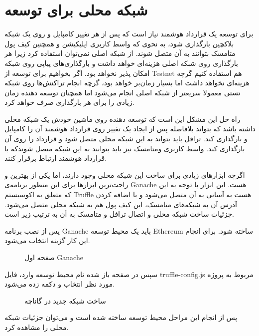 \section{شبکه محلی برای توسعه}
برای توسعه یک قرارداد هوشمند نیاز است که پس از هر تغییر کامپایل و روی یک شبکه بلاکچین بارگذاری شود، به نحوی که واسط کاربری اپلیکیشن و همچنین کیف پول متامسک بتوانند به آن متصل شوند.
از شبکه اصلی نمی‌توان استفاده کرد زیرا هر بارگذاری روی شبکه اصلی هزینه‌ای خواهد داشت و بارگذاری‌های پیاپی روی شبکه امکان پذیر نخواهد بود.
اگر بخواهیم برای توسعه از
\gls{Testnet}
هم استفاده کنیم گرچه هزینه‌ای نخواهد داشت اما بسیار زمان‌بر خواهد بود، گرچه انجام تراکنش‌ها روی شبکه تستی معمولا سریعتر از شبکه اصلی انجام می‌شود اما همچنان توسعه دهنده زمان زیادی را برای هر بارگذاری صرف خواهد کرد.

راه حل این مشکل این است که توسعه دهنده روی ماشین خودش یک شبکه محلی داشته باشد که بتواند بلافاصله پس از ایجاد یک تغییر روی قرارداد هوشمند آن را کامپایل و بارگذاری کند. ترافل باید بتواند به این شبکه محلی متصل شود و قرارداد را روی آن بارگذاری کند. واسط کاربری ومتامسک نیز باید بتوانند به این شبکه متصل شوندکه با قرارداد هوشمند ارتباط برقرار کنند.

اگرچه ابزارهای زیادی برای ساخت این شبکه محلی وجود دارند، اما یکی از بهترین و راحت‌ترین ابزارها برای این منظور برنامه‌ی Ganache هست. این ابزار با توجه به این که متعلق به اکوسیستم Truffle هست به آسانی به آن متصل می‌شود و با اضافه کردن آدرس آن به شبکه‌های متامسک، این کیف پول هم به شبکه محلی متصل می‌شود. جزئیات ساخت شبکه محلی و اتصال ترافل و متامسک به آن به ترتیب زیر است.

پس از نصب برنامه Ganache باید یک محیط توسعه Ethereum ساخته شود. برای انجام این کار گزینه
انتخاب می‌شود.

\begin{figure}[ht]
\centerline{}
\caption{صغحه اول Ganache}
\label{fig:ganache-1}
\end{figure}

سپس در صفحه باز شده نام محیط توسعه وارد،  فایل truffle-config.js مربوط به پروژه مورد نظر انتخاب و دکمه
زده می‌شود.

\begin{figure}[ht]
\centerline{}
\caption{ساخت شبکه جدید در گاناچه}
\label{fig:ganache-2}
\end{figure}

پس از انجام این مراحل محیط توسعه ساخته شده است و می‌توان جزئیات شبکه محلی را مشاهده کرد.


